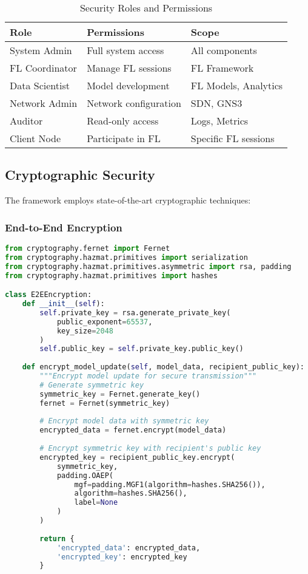 \begin{table}[htbp]
\centering
\caption{Security Roles and Permissions}
\label{tab:security-roles}
\begin{tabular}{|l|l|l|}
\hline
\textbf{Role} & \textbf{Permissions} & \textbf{Scope} \\
\hline
System Admin & Full system access & All components \\
\hline
FL Coordinator & Manage FL sessions & FL Framework \\
\hline
Data Scientist & Model development & FL Models, Analytics \\
\hline
Network Admin & Network configuration & SDN, GNS3 \\
\hline
Auditor & Read-only access & Logs, Metrics \\
\hline
Client Node & Participate in FL & Specific FL sessions \\
\hline
\end{tabular}
\end{table}

\subsection{Cryptographic Security}

The framework employs state-of-the-art cryptographic techniques:

\subsubsection{End-to-End Encryption}
\begin{lstlisting}[language=python, caption=E2E Encryption Implementation]
from cryptography.fernet import Fernet
from cryptography.hazmat.primitives import serialization
from cryptography.hazmat.primitives.asymmetric import rsa, padding
from cryptography.hazmat.primitives import hashes

class E2EEncryption:
    def __init__(self):
        self.private_key = rsa.generate_private_key(
            public_exponent=65537,
            key_size=2048
        )
        self.public_key = self.private_key.public_key()
        
    def encrypt_model_update(self, model_data, recipient_public_key):
        """Encrypt model update for secure transmission"""
        # Generate symmetric key
        symmetric_key = Fernet.generate_key()
        fernet = Fernet(symmetric_key)
        
        # Encrypt model data with symmetric key
        encrypted_data = fernet.encrypt(model_data)
        
        # Encrypt symmetric key with recipient's public key
        encrypted_key = recipient_public_key.encrypt(
            symmetric_key,
            padding.OAEP(
                mgf=padding.MGF1(algorithm=hashes.SHA256()),
                algorithm=hashes.SHA256(),
                label=None
            )
        )
        
        return {
            'encrypted_data': encrypted_data,
            'encrypted_key': encrypted_key
        }
\end{lstlisting}

